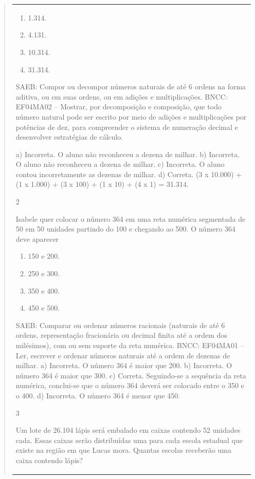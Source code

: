 \begin{mdframed}[linewidth=2pt,linecolor=salmao,roundcorner=2pt]
\begin{itemize}
{\begin{itemize}
\begin{escolha}
{\begin{quote}
{\begin{escolha}
{{{{{\begin{longtable}[]{@{}l@{}}
\begin{itemize}
{\begin{enumerate}
\item
  1.314.
\item
  4.131.
\item
  10.314.
\item
  31.314.
\end{enumerate}

SAEB: Compor ou decompor números naturais de até 6 ordens na
forma aditiva, ou em suas ordens, ou em adições e multiplicações.
BNCC: EF04MA02 -- Mostrar, por decomposição e composição, que todo número natural pode ser escrito
por meio de adições e multiplicações por potências de dez, para compreender o sistema de
numeração decimal e desenvolver estratégias de cálculo.

a) Incorreta. O aluno não reconheceu a dezena de milhar.
b) Incorreta. O aluno não reconheceu a dezena de milhar.
c) Incorreta. O aluno contou incorretamente as dezenas de milhar.
d) Correta. (3 x 10.000) + (1 x 1.000) + (3 x 100) + (1 x 10) + (4 x 1) = 31.314.

\num{2}

Isabele quer colocar o número 364 em uma reta numérica segmentada de 50 em 50 unidades partindo do 100 e chegando ao 500. O número 364 deve aparecer

\begin{enumerate}
\item
  150 e 200.
\item
  250 e 300.
\item
  350 e 400.
\item
  450 e 500.
\end{enumerate}

SAEB: Comparar ou ordenar números
racionais (naturais de até 6 ordens, representação fracionária ou
decimal finita até a ordem dos milésimos), com ou sem suporte da reta
numérica.
BNCC: EF04MA01 -- Ler, escrever e ordenar números naturais até a ordem de dezenas de milhar.
a) Incorreta. O número 364 é maior que 200.
b) Incorreta. O número 364 é maior que 300.
c) Correta. Seguindo-se a sequência da reta numérica, conclui-se que o número 364 deverá
ser colocado entre o 350 e o 400.
d) Incorreta. O número 364 é menor que 450.

\num{3}

Um lote de 26.104 lápis será embalado em caixas contendo 52 unidades cada. Essas caixas serão distribuídas uma para cada escola
estadual que existe na região em que Lucas mora. Quantas escolas
receberão uma caixa contendo lápis?

}
\end{itemize}
\end{longtable}}}}}}
\end{escolha}}
\end{quote}}
\end{escolha}
\end{itemize}}
\end{itemize}
\end{mdframed}
